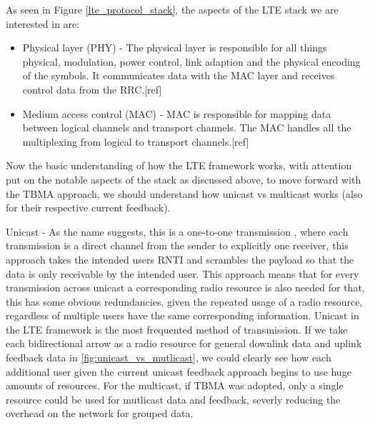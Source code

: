 \documentclass{article}
\begin{document}
As seen in Figure \ref{lte_protocol_stack}, the aspects of the LTE stack we are interested in are:
\begin{itemize}
    \item Physical layer (PHY) - The physical layer is responsible for all things physical, modulation, power control, link adaption and the physical encoding of the symbols. It communicates data with the MAC layer and receives control data from the RRC.[ref]
    \item Medium access control (MAC) - MAC is responsible for mapping data between logical channels and transport channels. The MAC handles all the multiplexing from logical to transport channels.[ref] 
\end{itemize}

Now the basic understanding of how the LTE framework works, with attention put on the notable aspects of the stack as discussed above, to move forward with the TBMA approach, we should understand how unicast vs multicast works (also for their respective current feedback). 

Unicast - As the name suggests, this is a one-to-one transmission , where each transmission is a direct channel from the sender to explicitly one receiver, this approach takes the intended users RNTI and scrambles the payload so that the data is only receivable by the intended user. This approach means that for every transmission across unicast a corresponding radio resource is also needed for that, this has some obvious redundancies, given the repeated usage of a radio resource, regardless of multiple users have the same corresponding information. Unicast in the LTE framework is the most frequented method of transmission. If we take each bidirectional arrow as a radio resource for general downlink data and uplink feedback data in \cref{fig:unicast_vs_mutlicast}, we could clearly see how each additional user given the current unicast feedback approach begins to use huge amounts of resources. For the multicast, if TBMA was adopted, only a single resource could be used for mutlicast data and feedback, severly reducing the overhead on the network for grouped data. 
\end{document}
